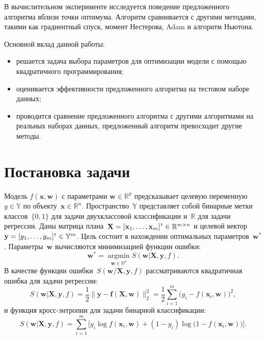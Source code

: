 \documentclass[a4paper,12pt]{article}
\theoremstyle{plain} %
\theoremstyle{definition} %
\theoremstyle{remark} %
\newcommand{\bw}{\mathbf{w}}
\newcommand{\by}{\mathbf{y}}
\newcommand{\bx}{\mathbf{x}}
\newcommand{\bbR}{\mathbb{R}}
\newcommand{\bbY}{\mathbb{Y}}
\newcommand{\bX}{\mathbf{X}}
\newcommand{\T}{{\text{\tiny\sffamily\upshape\mdseries T}}}
\newcommand{\argmin}{\mathop{\arg \min}\limits}
\begin{document}
	В вычислительном эксперименте исследуется поведение предложенного алгоритма вблизи точки оптимума.
	Алгоритм сравнивается с другими методами, такими как градиентный спуск, момент Нестерова, Adam и алгоритм Ньютона. 
	
	Основной вклад данной работы:
	\begin{itemize}
		\item решается задача выбора параметров для оптимизации модели с помощью квадратичного программирования; 
		\item оценивается эффективности предложенного алгоритма на тестовом наборе данных;
		\item проводится сравнение предложенного алгоритма с другими алгоритмами на реальных наборах данных, предложенный алгоритм превосходит другие методы.
	\end{itemize}
	
	\section*{Постановка задачи}
	
	Модель $f( \bx, \bw)$ с параметрами $\bw \in \mathbb{R}^p$ предсказывает целевую переменную~$y \in \bbY$ по объекту~$\bx \in \bbR^{n}$. Пространство~$\bbY$ представляет собой бинарные метки классов~$\{0, 1\}$ для задачи двухклассовой классификации и~$\bbR$ для задачи регрессии.
	Даны матрица плана~$\bX = [\bx_1, \dots, \bx_m]^{\T} \in \bbR^{m \times n}$ и целевой вектор~$\by = [y_1, \dots, y_m]^{\T} \in \bbY^{m}$. 
	Цель состоит в нахождении оптимальных параметров~$\bw^*$.
	Параметры~$\bw$ вычисляются минимизацией функции ошибки:
	\begin{equation}
	\bw^* = \argmin_{\bw \in \bbR^p} S(\bw | \bX, \by, f).
	\label{eq:error_function}
	\end{equation}
	В качестве функции ошибки~$S (\bw / \bX, \by, f)$ рассматриваются квадратичная ошибка для задачи регрессии:
	\begin{equation}
	S(\bw | \bX, \by, f) = \frac 12 \| \by - \mathbf{f}(\bX, \bw) \|_2^2 = \frac 12 \sum_{i=1}^m \bigl( y_i - f(\bx_i,  \bw)\bigr)^2,
	\label{eq:squared_error}
	\end{equation}
	и функция кросс-энтропии для задачи бинарной классификации: 
	\begin{equation}
	S(\bw | \bX, \by, f) = \sum_{i=1}^m \bigl[y_i \log f (\bx_i , \bw) + (1-y_i) \log \bigl(1 - f (\bx_i , \bw)\bigr)\bigr].
	\label{eq:log_loss}
	\end{equation}
	
\end{document}
